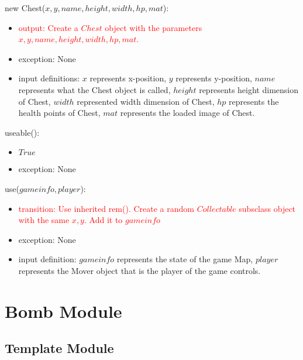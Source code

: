 \documentclass[12pt]{article}
\newcommand{\m}[1]{\mbox{#1}}
\begin{document}
new Chest($x, y, name, height, width, hp, mat$):
\begin{itemize}
    \item \textcolor{red}{output: Create a $Chest$ object with the parameters $x, y, name, height, width, hp, mat$.}
    \item exception: None
    \item input definitions: $x$ represents x-position, $y$ represents y-position, $name$ represents what the Chest object is called, $height$ represents height dimension of Chest, $width$ represented width dimension of Chest, $hp$ represents the health points of Chest, $mat$ represents the loaded image of Chest.
\end{itemize}

\noindent useable():
\begin{itemize}
    \item $True$
    \item exception: None
\end{itemize}

\noindent use($gameinfo, player$):
\begin{itemize}
    \item \textcolor{red}{transition: Use inherited rem(). Create a random $Collectable$ subsclass object with the same $x, y$. Add it to $gameinfo$ }
    \item exception: None
    \item input definition: $gameinfo$ represents the state of the game Map, $player$ represents the Mover object that is the player of the game controls.
\end{itemize}

\newpage

\section*{Bomb Module}

\subsection*{Template Module}
\end{document}
